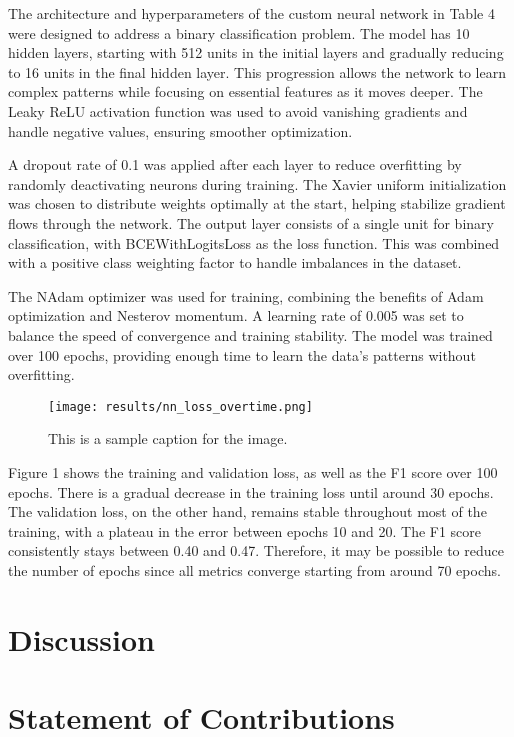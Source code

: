 \documentclass{article} %
\begin{document}
The architecture and hyperparameters of the custom neural network in Table 4 were designed to address a binary classification problem. The model has 10 hidden layers, starting with 512 units in the initial layers and gradually reducing to 16 units in the final hidden layer. This progression allows the network to learn complex patterns while focusing on essential features as it moves deeper. The Leaky ReLU activation function was used to avoid vanishing gradients and handle negative values, ensuring smoother optimization.

A dropout rate of 0.1 was applied after each layer to reduce overfitting by randomly deactivating neurons during training. The Xavier uniform initialization was chosen to distribute weights optimally at the start, helping stabilize gradient flows through the network. The output layer consists of a single unit for binary classification, with BCEWithLogitsLoss as the loss function. This was combined with a positive class weighting factor to handle imbalances in the dataset.

The NAdam optimizer was used for training, combining the benefits of Adam optimization and Nesterov momentum. A learning rate of 0.005 was set to balance the speed of convergence and training stability. The model was trained over 100 epochs, providing enough time to learn the data's patterns without overfitting.


\begin{figure}[ht!]
   \centering
   \texttt{[image: results/nn\_loss\_overtime.png]}
   \caption{This is a sample caption for the image.}
   \label{fig:sample-image}
\end{figure}

Figure 1 shows the training and validation loss, as well as the F1 score over 100 epochs. There is a gradual decrease in the training loss until around 30 epochs. The validation loss, on the other hand, remains stable throughout most of the training, with a plateau in the error between epochs 10 and 20. The F1 score consistently stays between 0.40 and 0.47. Therefore, it may be possible to reduce the number of epochs since all metrics converge starting from around 70 epochs.


\section{Discussion}

\section{Statement of Contributions}
\label{others}
\end{document}
